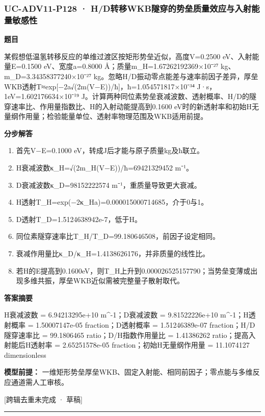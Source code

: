 \documentclass[UTF8,11pt,a4paper]{ctexart}
\begin{document}
\subsubsection*{UC-ADV11-P128 · H/D转移WKB隧穿的势垒质量效应与入射能量敏感性}
\noindent\textbf{题目}\par
某假想低温氢转移反应的单维过渡区按矩形势垒近似，高度V=0.2500 eV、入射能量E=0.1500 eV、宽度a=0.8000 Å；质量m\_H=1.67262192369×10⁻²⁷ kg、m\_D=3.34358377240×10⁻²⁷ kg。忽略H/D振动零点能差与速率前因子差异，厚垒WKB透射T≈exp[−2a√(2m(V−E))/ħ]，ħ=1.054571817×10⁻³⁴ J·s，1eV=1.602176634×10⁻¹⁹ J。计算两种同位素势垒衰减波数、透射概率、H/D的隧穿速率比、作用量指数比、H的入射动能提高到0.1600 eV时的新透射率和初始H无量纲作用量；检验能量单位、透射率物理范围及WKB适用前提。\par
\medskip\noindent\textbf{分步解答}
\begin{enumerate}
\item 首先V−E=0.1000 eV，转成J后才能与原子质量kg及ħ联立。
\item H衰减波数κ\_H=√(2m\_H(V−E))/ħ=69421329452 m⁻¹。
\item D衰减波数κ\_D=98152222574 m⁻¹，重质量导致更大衰减。
\item H透射T\_H=exp(−2κ\_Ha)=0.000015000714685，介于0与1。
\item D透射T\_D=1.5124638942e-7，低于H。
\item 同位素隧穿速率比T\_H/T\_D=99.180646508，前因子设定相同。
\item 衰减作用量比κ\_D/κ\_H=1.4138626176，并非质量的线性比。
\item 若H的E提高到0.1600eV，则T\_H上升到0.000026525157790；当势垒变薄或出现多维共振，厚垒WKB近似需被完整量子散射取代。
\end{enumerate}
\noindent\textbf{答案摘要}\par
H衰减波数 = 6.94213295e+10 m\textasciicircum{}-1；D衰减波数 = 9.81522226e+10 m\textasciicircum{}-1；H透射概率 = 1.50007147e-05 fraction；D透射概率 = 1.51246389e-07 fraction；H/D隧穿速率比 = 99.1806465 ratio；D/H指数作用量比 = 1.41386262 ratio；提高入射能后H透射率 = 2.65251578e-05 fraction；初始H无量纲作用量 = 11.1074127 dimensionless\par
\noindent\textbf{模型前提：}
一维矩形势垒厚垒WKB、固定入射能、相同前因子；零点能与多维反应通道需人工审核。\par
\noindent\textcolor{red!65!black}{[跨辑去重未完成 · 草稿]} \par
\medskip\hrule\medskip
{}
\end{document}
